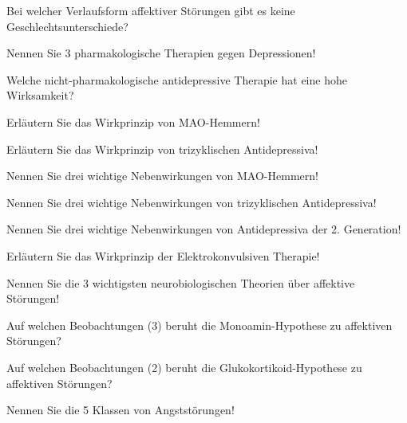 \documentclass[10pt, a4paper]{exam}
\begin{document}
\begin{questions}
\begin{solution}
  \end{solution}
  \question Bei welcher Verlaufsform affektiver Störungen gibt es keine Geschlechtsunterschiede?
  \begin{solution}
  \end{solution}
  \question Nennen Sie 3 pharmakologische Therapien gegen Depressionen!
  \begin{solution}
  \end{solution}
  \question Welche nicht-pharmakologische antidepressive Therapie hat eine hohe Wirksamkeit?
  \begin{solution}
  \end{solution}
  \question Erläutern Sie das Wirkprinzip von MAO-Hemmern!
  \begin{solution}
  \end{solution}
  \question Erläutern Sie das Wirkprinzip von trizyklischen Antidepressiva!
  \begin{solution}
  \end{solution}
  \question Nennen Sie drei wichtige Nebenwirkungen von MAO-Hemmern!
  \begin{solution}
  \end{solution}
  \question Nennen Sie drei wichtige Nebenwirkungen von trizyklischen Antidepressiva!
  \begin{solution}
  \end{solution}
  \question Nennen Sie drei wichtige Nebenwirkungen von Antidepressiva der 2.  Generation!
  \begin{solution}
  \end{solution}
  \question Erläutern Sie das Wirkprinzip der Elektrokonvulsiven Therapie!
  \begin{solution}
  \end{solution}
  \question Nennen Sie die 3 wichtigsten neurobiologischen Theorien über affektive Störungen!
  \begin{solution}
  \end{solution}
  \question Auf welchen Beobachtungen (3) beruht die Monoamin-Hypothese zu affektiven Störungen?
  \begin{solution}
  \end{solution}
  \question Auf welchen Beobachtungen (2) beruht die Glukokortikoid-Hypothese zu affektiven Störungen?
  \begin{solution}
  \end{solution}
  \question Nennen Sie die 5 Klassen von Angststörungen!
  \begin{solution}
  \end{solution}

\end{questions}
\end{document}
